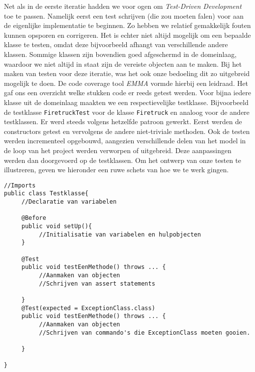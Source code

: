 \label{testen}
Net als in de eerste iteratie hadden we voor ogen om \textit{Test-Driven Development} toe te passen.
Namelijk eerst een test schrijven (die zou moeten falen) voor aan de eigenlijke implementatie te beginnen.
Zo hebben we relatief gemakkelijk fouten kunnen opsporen en corrigeren. Het is echter niet altijd mogelijk om een bepaalde klasse te testen, omdat deze bijvoorbeeld afhangt van verschillende andere klassen. Sommige klassen zijn bovendien goed afgeschermd in de domeinlaag, waardoor we niet altijd in staat zijn de vereiste objecten aan te maken.
Bij het maken van testen voor deze iteratie, was het ook onze bedoeling dit zo uitgebreid mogelijk te doen.
De code coverage tool \textit{EMMA} vormde hierbij een leidraad. Het gaf ons een overzicht welke stukken code er reeds getest werden.
Voor bijna iedere klasse uit de domeinlaag maakten we een respectievelijke testklasse.
Bijvoorbeeld de testklasse \texttt{FiretruckTest} voor de klasse \texttt{Firetruck} en analoog voor de andere testklassen.
Er werd steeds volgens hetzelfde patroon gewerkt. Eerst werden de constructors getest en vervolgens de andere niet-triviale methoden.
Ook de testen werden incrementeel opgebouwd, aangezien verschillende delen van het model in de loop van het project werden verworpen of uitgebreid.
Deze aanpassingen werden dan doorgevoerd op de testklassen.
Om het ontwerp van onze testen te illustreren, geven we hieronder een ruwe schets van hoe we te werk gingen.
\begin{lstlisting}
//Imports
public class Testklasse{
     //Declaratie van variabelen

     @Before
     public void setUp(){
          //Initialisatie van variabelen en hulpobjecten
     }

     @Test
     public void testEenMethode() throws ... {
          //Aanmaken van objecten
          //Schrijven van assert statements

     }
     @Test(expected = ExceptionClass.class)
     public void testEenMethode() throws ... {
          //Aanmaken van objecten
          //Schrijven van commando's die ExceptionClass moeten gooien.

     }

}
\end{lstlisting}